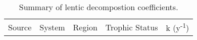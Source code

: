 \begin{table}
\label{tab:k_summary}
\begin{tabular}{l l l l l}
Source & System & Region & Trophic Status & k (y\textsuperscript{-1}) \\

\end{tabular}
\caption{Summary of lentic decompostion coefficients.}
\end{table}